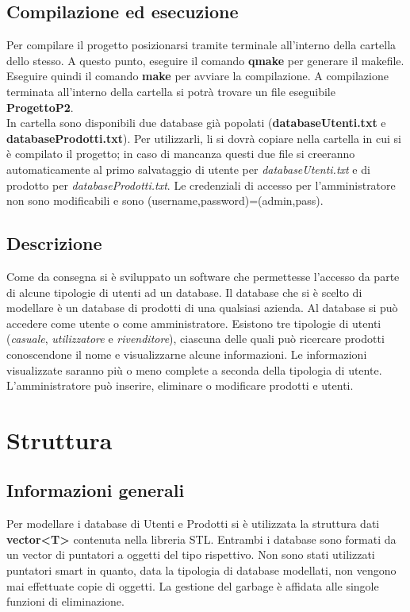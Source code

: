 \documentclass[a4paper,10pt] {article}
\begin{document}
\subsection{Compilazione ed esecuzione}
Per compilare il progetto posizionarsi tramite terminale all'interno della cartella dello stesso. A questo punto, eseguire il comando \textbf{qmake} per generare
il makefile. Eseguire quindi il comando \textbf{make} per avviare la compilazione. A compilazione terminata all'interno della cartella si potrà trovare un file 
eseguibile \textbf{ProgettoP2}.\\
In cartella sono disponibili due database già popolati (\textbf{databaseUtenti.txt} e \textbf{databaseProdotti.txt}). Per utilizzarli, li si dovrà copiare nella cartella in cui si è compilato il progetto; in caso di mancanza questi due file si creeranno automaticamente al primo salvataggio di utente per \textsl{databaseUtenti.txt} e di prodotto per \textsl{databaseProdotti.txt}.
Le credenziali di accesso per l'amministratore non sono modificabili e sono (username,password)=(admin,pass).

\subsection{Descrizione}
Come da consegna si è sviluppato un software che permettesse l'accesso da parte di alcune tipologie di utenti ad un database. Il database che si è scelto di 
modellare è un database di prodotti di una qualsiasi azienda. Al database si può accedere come utente o come amministratore. Esistono tre tipologie di utenti (\textsl{casuale}, \textsl{utilizzatore} e \textsl{rivenditore}),
ciascuna delle quali può
ricercare prodotti conoscendone il nome e visualizzarne alcune informazioni. Le informazioni visualizzate saranno più o meno complete a seconda della tipologia
di utente. L'amministratore può inserire, eliminare o modificare prodotti e utenti.

\newpage

\section{Struttura}

\subsection{Informazioni generali}
Per modellare i database di Utenti e Prodotti si è utilizzata la struttura dati \textbf{vector<T>} contenuta nella libreria STL. Entrambi i database sono formati
da un vector di puntatori a oggetti del tipo rispettivo. Non sono stati utilizzati puntatori smart in quanto, data la tipologia di database modellati, non vengono
mai effettuate copie di oggetti. La gestione del garbage è affidata alle singole funzioni di eliminazione.
\end{document}
